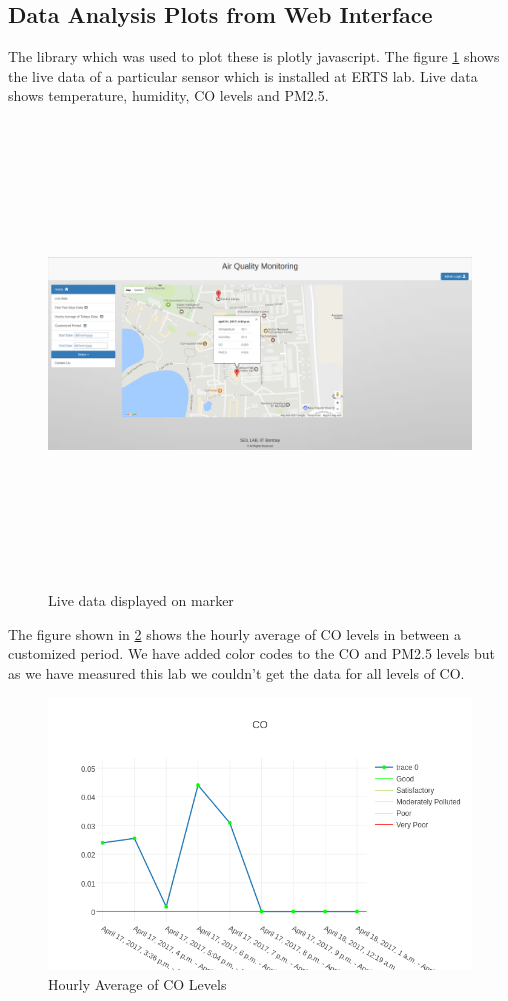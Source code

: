 \documentclass[a4paper,12pt]{article}
\begin{document}
\subsection{Data Analysis Plots from Web Interface}
The library which was used to plot these is plotly javascript\cite{Plotly}. The figure \ref{live} shows the live data of a particular sensor which is installed at ERTS lab. Live data shows temperature, humidity, CO levels and PM2.5. 
\begin{figure}[!ht]
	\centering
	\includegraphics[width=500pt,height=350pt]{live.png}
	\caption{Live data displayed on marker}
	\label{live}
\end{figure}
The figure shown in \ref{co} shows the hourly average of CO levels in between a customized period. We have added color codes to the CO and PM2.5 levels but as we have measured this lab we couldn't get the data for all levels of CO.
\begin{figure}[!ht]
	\centering
	\includegraphics[scale=0.5]{co.png}
	\caption{Hourly Average of CO Levels}
	\label{co}
\end{figure}
\end{document}

